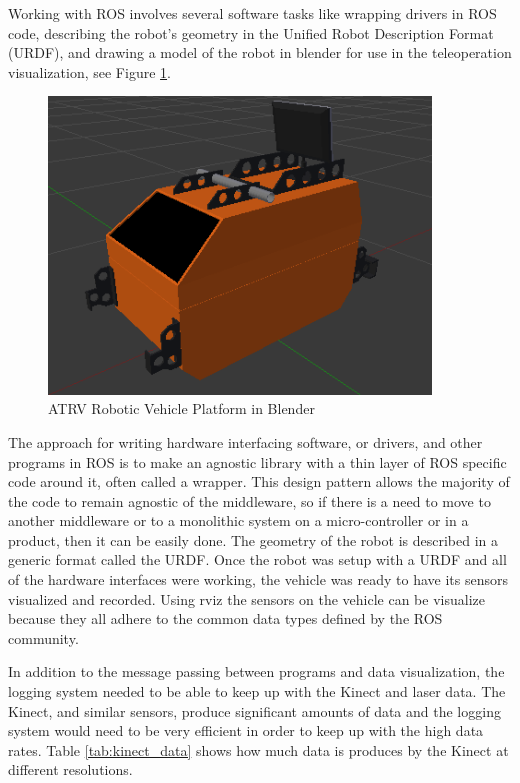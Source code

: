 \documentclass[12pt]{report}
\begin{document}
Working with ROS involves several software tasks like wrapping drivers in ROS code, describing the robot's geometry in the Unified Robot Description Format (URDF), and drawing a model of the robot in blender for use in the teleoperation visualization, see Figure \ref{fig:atrv_blender}.

\begin{figure}[ht]
  \centering
  \includegraphics[width=4in,keepaspectratio]{atrv_blender.png}
  \caption{ATRV Robotic Vehicle Platform in Blender}
  \label{fig:atrv_blender}
\end{figure}

The approach for writing hardware interfacing software, or drivers, and other programs in ROS is to make an agnostic library with a thin layer of ROS specific code around it, often called a wrapper.  This design pattern allows the majority of the code to remain agnostic of the middleware, so if there is a need to move to another middleware or to a monolithic system on a micro-controller or in a product, then it can be easily done.  The geometry of the robot is described in a generic format called the URDF.  Once the robot was setup with a URDF and all of the hardware interfaces were working, the vehicle was ready to have its sensors visualized and recorded.  Using rviz the sensors on the vehicle can be visualize because they all adhere to the common data types defined by the ROS community.  

In addition to the message passing between programs and data visualization, the logging system needed to be able to keep up with the Kinect and laser data.  The Kinect, and similar sensors, produce significant amounts of data and the logging system would need to be very efficient in order to keep up with the high data rates.  Table \ref{tab:kinect_data} shows how much data is produces by the Kinect at different resolutions.
\end{document}
